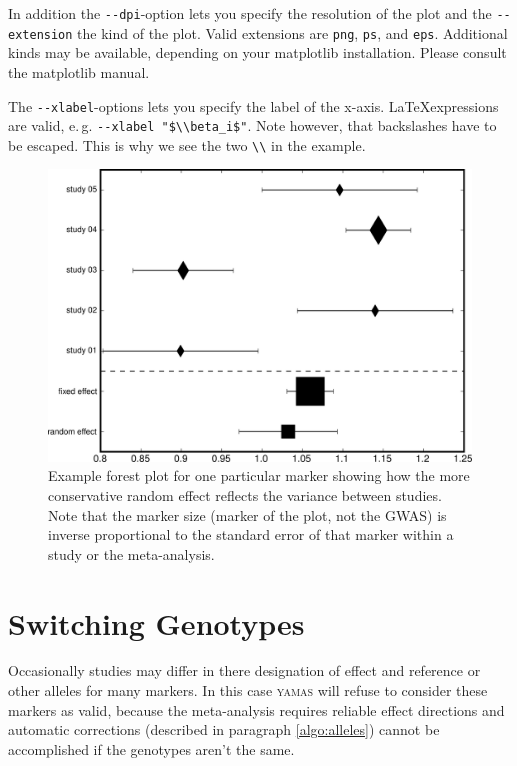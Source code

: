 In addition the \verb+--dpi+-option lets you specify the resolution of the plot and the \verb+--extension+ the kind of the plot. Valid extensions are \verb+png+, \verb+ps+, and \verb+eps+. Additional kinds may be available, depending on your matplotlib installation. Please consult the matplotlib manual.

The \verb+--xlabel+-options lets you specify the label of the x-axis. \LaTeX expressions are valid, e.\,g. \verb+--xlabel "$\\beta_i$"+. Note however, that backslashes have to be escaped. This is why we see the two \verb+\\+ in the example.

\clearpage
\pagebreak

\begin{figure}[H]
 \centering
 \includegraphics[width=.75\textwidth]{./images/rs9442372.png}
 \caption{Example forest plot for one particular marker showing how the more conservative random effect reflects the variance between studies. Note that the marker size (marker of the plot, not the GWAS) is inverse proportional to the standard error of that marker within a study or the meta-analysis.}
 \label{utilities:fig:forest_plot}
\end{figure}

\section{Switching Genotypes}

Occasionally studies may differ in there designation of effect and reference or other alleles for many markers. In this case \textsc{yamas} will refuse to consider these markers as valid, because the meta-analysis requires reliable effect directions and automatic corrections (described in paragraph \ref{algo:alleles}) cannot be accomplished if the genotypes aren't the same.


